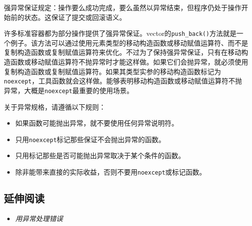 
\begin{myNote}
强异常保证规定：操作要么成功完成，要么虽然以异常结束，但程序仍处于操作开始前的状态。这保证了提交或回滚语义。
\end{myNote}



许多标准容器都为部分操作提供了强异常保证。vector的\texttt{push\_\allowbreak{}back()}方法就是一个例子。该方法可以通过使用元素类型的移动构造函数或移动赋值运算符、而不是复制构造函数或复制赋值运算符来优化。不过为了保持强异常保证，只有在移动构造函数或移动赋值运算符不抛异常时才能这样做。如果它们会抛异常，就必须使用复制构造函数或复制赋值运算符。如果其类型实参的移动构造函数标记为\texttt{noexcept}，工具函数就会这样做。能够表明移动构造函数或移动赋值运算符不抛异常，大概是\texttt{noexcept}最重要的使用场景。



关于异常规格，请遵循以下规则：



\begin{itemize}
\item 如果函数可能抛出异常，就不要使用任何异常说明符。



\item 只用\texttt{noexcept}标记那些保证不会抛出异常的函数。



\item 只用标记那些是否可能抛出异常取决于某个条件的函数。



\item 除非能带来直接的实际收益，否则不要用\texttt{noexcept}或标记函数。

\end{itemize}



\subsection{延伸阅读}



\begin{itemize}
\item \textit{用异常处理错误}

\end{itemize}


